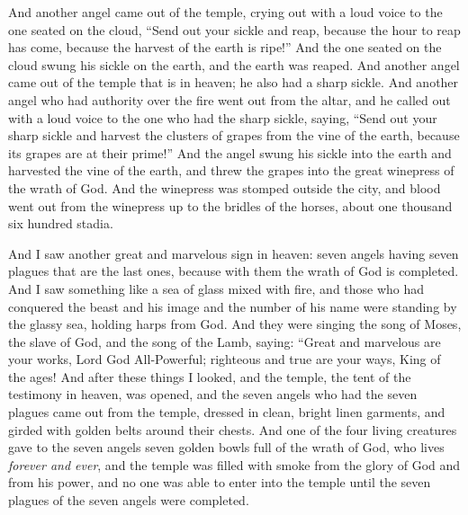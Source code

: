 \begin{biblechapter}
\verse And another angel came out of the temple, crying out with a loud voice to the one seated on the cloud, “Send out your sickle and reap, because the hour to reap has come, because the harvest of the earth is ripe!”
\verse And the one seated on the cloud swung his sickle on the earth, and the earth was reaped.
\verse And another angel came out of the temple that is in heaven; he also had a sharp sickle.
\verse And another angel who had authority over the fire went out from the altar, and he called out with a loud voice to the one who had the sharp sickle, saying, “Send out your sharp sickle and harvest the clusters of grapes from the vine of the earth, because its grapes are at their prime!”
\verse And the angel swung his sickle into the earth and harvested the vine of the earth, and threw the grapes into the great winepress of the wrath of God.
\verse And the winepress was stomped outside the city, and blood went out from the winepress up to the bridles of the horses, about one thousand six hundred stadia.
\end{biblechapter}

\begin{biblechapter} %
 And I saw another great and marvelous sign in heaven: seven angels having seven plagues that are the last ones, because with them the wrath of God is completed.
\verse And I saw something like a sea of glass mixed with fire, and those who had conquered the beast and his image and the number of his name were standing by the glassy sea, holding harps from God.
\verse And they were singing the song of Moses, the slave of God, and the song of the Lamb, saying:
\verse “Great and marvelous are your works, 
Lord God All-Powerful; 
righteous and true are your ways, 
King of the ages!
\verse And after these things I looked, and the temple, the tent of the testimony in heaven, was opened,
\verse and the seven angels who had the seven plagues came out from the temple, dressed in clean, bright linen garments, and girded with golden belts around their chests.
\verse And one of the four living creatures gave to the seven angels seven golden bowls full of the wrath of God, who lives \textit{forever and ever},
\verse and the temple was filled with smoke from the glory of God and from his power, and no one was able to enter into the temple until the seven plagues of the seven angels were completed.
\end{biblechapter}

